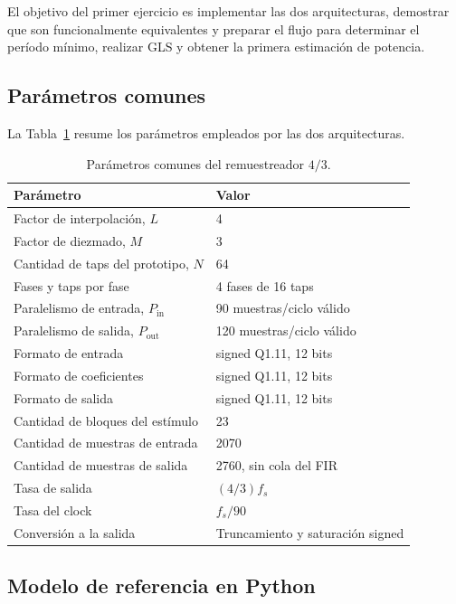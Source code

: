 \documentclass[10pt,a4paper]{article}
\begin{document}
El objetivo del primer ejercicio es implementar las dos arquitecturas, demostrar
que son funcionalmente equivalentes y preparar el flujo para determinar el período
mínimo, realizar GLS y obtener la primera estimación de potencia.

\subsection{Parámetros comunes}

La Tabla~\ref{tab:parametros-comunes} resume los parámetros empleados por las dos
arquitecturas.

\begin{table}[H]
    \centering
    \caption{Parámetros comunes del remuestreador $4/3$.}
    \label{tab:parametros-comunes}
    \begin{tabular}{@{}ll@{}}
        \toprule
        \textbf{Parámetro} & \textbf{Valor} \\
        \midrule
        Factor de interpolación, $L$ & 4 \\
        Factor de diezmado, $M$ & 3 \\
        Cantidad de taps del prototipo, $N$ & 64 \\
        Fases y taps por fase & 4 fases de 16 taps \\
        Paralelismo de entrada, $P_{\mathrm{in}}$ & 90 muestras/ciclo válido \\
        Paralelismo de salida, $P_{\mathrm{out}}$ & 120 muestras/ciclo válido \\
        Formato de entrada & signed Q1.11, 12 bits \\
        Formato de coeficientes & signed Q1.11, 12 bits \\
        Formato de salida & signed Q1.11, 12 bits \\
        Cantidad de bloques del estímulo & 23 \\
        Cantidad de muestras de entrada & 2070 \\
        Cantidad de muestras de salida & 2760, sin cola del FIR \\
        Tasa de salida & $(4/3)f_s$ \\
        Tasa del clock & $f_s/90$ \\
        Conversión a la salida & Truncamiento y saturación signed \\
        \bottomrule
    \end{tabular}
\end{table}

\subsection{Modelo de referencia en Python}
\label{sec:modelo-referencia}
\end{document}

